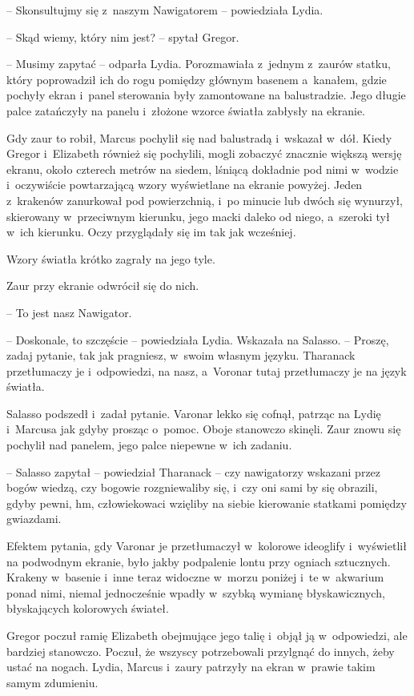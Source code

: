 \documentclass[oneside,polish,12pt,sfheadings]{mwbk}
\begin{document}
-- Skonsultujmy się z~naszym Nawigatorem -- powiedziała Lydia.

-- Skąd wiemy, który nim jest? -- spytał Gregor.

-- Musimy zapytać -- odparła Lydia. Porozmawiała z~jednym z~zaurów statku,
który poprowadził ich do rogu pomiędzy głównym basenem a~kanałem, gdzie
pochyły ekran i~panel sterowania były zamontowane na balustradzie. Jego
długie palce zatańczyły na panelu i~złożone wzorce światła zabłysły na
ekranie.

Gdy zaur to robił, Marcus pochylił się nad balustradą i~wskazał w~dół.
Kiedy Gregor i~Elizabeth również się pochylili, mogli zobaczyć znacznie
większą wersję ekranu, około czterech metrów na siedem, lśniącą
dokładnie pod nimi w~wodzie i~oczywiście powtarzającą wzory wyświetlane
na ekranie powyżej. Jeden z~krakenów zanurkował pod powierzchnią, i~po
minucie lub dwóch się wynurzył, skierowany w~przeciwnym kierunku, jego
macki daleko od niego, a~szeroki tył w~ich kierunku. Oczy przyglądały
się im tak jak wcześniej.

Wzory światła krótko zagrały na jego tyle.

Zaur przy ekranie odwrócił się do nich.

-- To jest nasz Nawigator.

-- Doskonale, to szczęście -- powiedziała Lydia. Wskazała na Salasso. -- Proszę, zadaj pytanie, tak jak pragniesz, w~swoim własnym języku.
Tharanack przetłumaczy je i~odpowiedzi, na nasz, a~Voronar tutaj
przetłumaczy je na język światła.

Salasso podszedł i~zadał pytanie. Varonar lekko się cofnął, patrząc na
Lydię i~Marcusa jak gdyby prosząc o~pomoc. Oboje stanowczo skinęli. Zaur
znowu się pochylił nad panelem, jego palce niepewne w~ich zadaniu.

-- Salasso zapytał -- powiedział Tharanack -- czy nawigatorzy wskazani
przez bogów wiedzą, czy bogowie rozgniewaliby się, i~czy oni sami by się
obrazili, gdyby pewni, hm, człowiekowaci wzięliby na siebie kierowanie
statkami pomiędzy gwiazdami.

Efektem pytania, gdy Varonar je przetłumaczył w~kolorowe ideoglify i~wyświetlił na podwodnym ekranie, było jakby podpalenie lontu przy
ogniach sztucznych. Krakeny w~basenie i~inne teraz widoczne w~morzu
poniżej i~te w~akwarium ponad nimi, niemal jednocześnie wpadły w~szybką
wymianę błyskawicznych, błyskających kolorowych świateł.

Gregor poczuł ramię Elizabeth obejmujące jego talię i~objął ją w~odpowiedzi, ale bardziej stanowczo. Poczuł, że wszyscy potrzebowali
przylgnąć do innych, żeby ustać na nogach. Lydia, Marcus i~zaury
patrzyły na ekran w~prawie takim samym zdumieniu.
\end{document}
